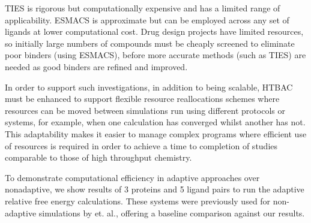 TIES is rigorous but computationally expensive and has a limited range of 
applicability.
ESMACS is approximate but can be employed across any set of ligands at lower 
computational cost.
Drug design projects have limited resources,
so initially large numbers of compounds must be cheaply screened
to eliminate poor binders (using ESMACS), 
before more accurate methods (such as
TIES) are needed as good binders are refined and improved. %

In order to support such
investigations, in addition to being scalable, HTBAC must be enhanced to
support flexible resource reallocations schemes where resources can be moved
between simulations run using different protocols or systems, for example,
when one calculation has converged whilst another has not. This adaptability
makes it easier to manage complex programs where efficient use of resources
is required in order to achieve a time to completion of studies comparable to
those of high throughput chemistry. 


To demonstrate computational efficiency in adaptive approaches over nonadaptive, 
we show results of 3 proteins and 5 ligand pairs to run the adaptive relative 
free energy calculations. These systems were previously used for non-adaptive 
simulations by \cite{} et. al., offering a baseline comparison against our 
results.






